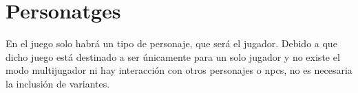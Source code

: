 \section{Personatges}
En el juego solo habrá un tipo de personaje, que será el jugador. Debido a que dicho juego está destinado a ser únicamente para un solo jugador y no existe el modo multijugador ni hay interacción con otros personajes o npcs, no es necesaria la inclusión de variantes.